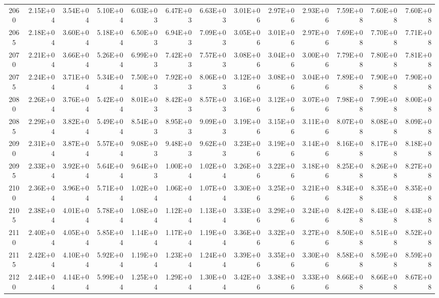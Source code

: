 \documentclass{article}
\begin{document}
\begin{table}
\begin{tabular}{crrr|rrr|rrr|rrr}
2060     & 2.15E+04   & 3.54E+04   & 5.10E+04   & 6.03E+03   & 6.47E+03   & 6.63E+03   & 3.01E+06   & 2.97E+06   & 2.93E+06   & 7.59E+08   & 7.60E+08   & 7.60E+08   \\
2065     & 2.18E+04   & 3.60E+04   & 5.18E+04   & 6.50E+03   & 6.94E+03   & 7.09E+03   & 3.05E+06   & 3.01E+06   & 2.97E+06   & 7.69E+08   & 7.70E+08   & 7.71E+08   \\
2070     & 2.21E+04   & 3.66E+04   & 5.26E+04   & 6.99E+03   & 7.42E+03   & 7.57E+03   & 3.08E+06   & 3.04E+06   & 3.00E+06   & 7.79E+08   & 7.80E+08   & 7.81E+08   \\
2075     & 2.24E+04   & 3.71E+04   & 5.34E+04   & 7.50E+03   & 7.92E+03   & 8.06E+03   & 3.12E+06   & 3.08E+06   & 3.04E+06   & 7.89E+08   & 7.90E+08   & 7.90E+08   \\
2080     & 2.26E+04   & 3.76E+04   & 5.42E+04   & 8.01E+03   & 8.42E+03   & 8.57E+03   & 3.16E+06   & 3.12E+06   & 3.07E+06   & 7.98E+08   & 7.99E+08   & 8.00E+08   \\
2085     & 2.29E+04   & 3.82E+04   & 5.49E+04   & 8.54E+03   & 8.95E+03   & 9.09E+03   & 3.19E+06   & 3.15E+06   & 3.11E+06   & 8.07E+08   & 8.08E+08   & 8.09E+08   \\
2090     & 2.31E+04   & 3.87E+04   & 5.57E+04   & 9.08E+03   & 9.48E+03   & 9.62E+03   & 3.23E+06   & 3.19E+06   & 3.14E+06   & 8.16E+08   & 8.17E+08   & 8.18E+08   \\
2095     & 2.33E+04   & 3.92E+04   & 5.64E+04   & 9.64E+03   & 1.00E+04   & 1.02E+04   & 3.26E+06   & 3.22E+06   & 3.18E+06   & 8.25E+08   & 8.26E+08   & 8.27E+08   \\
2100     & 2.36E+04   & 3.96E+04   & 5.71E+04   & 1.02E+04   & 1.06E+04   & 1.07E+04   & 3.30E+06   & 3.25E+06   & 3.21E+06   & 8.34E+08   & 8.35E+08   & 8.35E+08   \\
2105     & 2.38E+04   & 4.01E+04   & 5.78E+04   & 1.08E+04   & 1.12E+04   & 1.13E+04   & 3.33E+06   & 3.29E+06   & 3.24E+06   & 8.42E+08   & 8.43E+08   & 8.43E+08   \\
2110     & 2.40E+04   & 4.05E+04   & 5.85E+04   & 1.14E+04   & 1.17E+04   & 1.19E+04   & 3.36E+06   & 3.32E+06   & 3.27E+06   & 8.50E+08   & 8.51E+08   & 8.52E+08   \\
2115     & 2.42E+04   & 4.10E+04   & 5.92E+04   & 1.19E+04   & 1.23E+04   & 1.24E+04   & 3.39E+06   & 3.35E+06   & 3.30E+06   & 8.58E+08   & 8.59E+08   & 8.59E+08   \\
2120     & 2.44E+04   & 4.14E+04   & 5.99E+04   & 1.25E+04   & 1.29E+04   & 1.30E+04   & 3.42E+06   & 3.38E+06   & 3.33E+06   & 8.66E+08   & 8.66E+08   & 8.67E+08   \\

\end{tabular}
\end{table}
\end{document}
